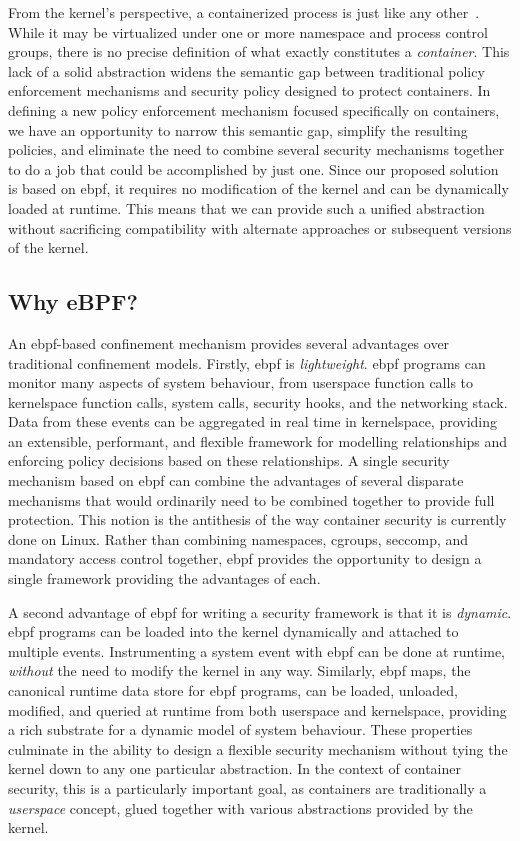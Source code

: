 From the kernel's perspective, a containerized process is just like any
other~\cite{sultan2019_container_security}. While it may be virtualized under one or more
namespace and process control groups, there is no precise definition of what exactly
constitutes a \textit{container}. This lack of a solid abstraction widens the semantic gap
between traditional policy enforcement mechanisms and security policy designed to protect
containers. In defining a new policy enforcement mechanism focused specifically on
containers, we have an opportunity to narrow this semantic gap, simplify the resulting
policies, and eliminate the need to combine several security mechanisms together to do
a job that could be accomplished by just one. Since our proposed solution is based on
\gls{ebpf}, it requires no modification of the kernel and can be dynamically loaded at
runtime. This means that we can provide such a unified abstraction without sacrificing
compatibility with alternate approaches or subsequent versions of the kernel.

\subsection{Why eBPF?}%
\label{ss:why-ebpf}

An \gls{ebpf}-based confinement mechanism provides several advantages over traditional
confinement models.  Firstly, \gls{ebpf} is \textit{lightweight}. \gls{ebpf} programs can monitor
many aspects of system behaviour, from userspace function calls to kernelspace function
calls, system calls, security hooks, and the networking stack. Data from these events can
be aggregated in real time in kernelspace, providing an extensible, performant, and
flexible framework for modelling relationships and enforcing policy decisions based on
these relationships.  A single security mechanism based on \gls{ebpf} can combine the advantages
of several disparate mechanisms that would ordinarily need to be combined together to
provide full protection. This notion is the antithesis of the way container security is
currently done on Linux. Rather than combining namespaces, cgroups, seccomp, and mandatory
access control together, \gls{ebpf} provides the opportunity to design a single framework
providing the advantages of each.

A second advantage of \gls{ebpf} for writing a security framework is that it is
\textit{dynamic}. \gls{ebpf} programs can be loaded into the kernel dynamically and attached to
multiple events. Instrumenting a system event with \gls{ebpf} can be done at runtime,
\textit{without} the need to modify the kernel in any way.  Similarly, \gls{ebpf} maps, the
canonical runtime data store for \gls{ebpf} programs, can be loaded, unloaded, modified, and
queried at runtime from both userspace and kernelspace, providing a rich substrate for
a dynamic model of system behaviour. These properties culminate in the ability to design
a flexible security mechanism without tying the kernel down to any one particular
abstraction. In the context of container security, this is a particularly important goal,
as containers are traditionally a \textit{userspace} concept, glued together with various
abstractions provided by the kernel.

